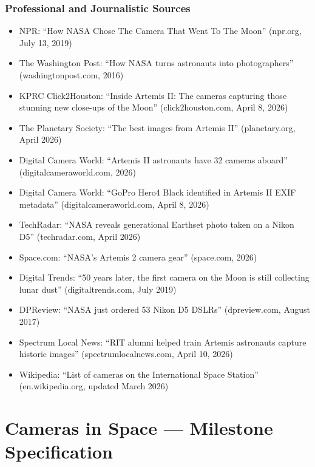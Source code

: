 \documentclass[11pt,letterpaper]{article}
\newcommand{\stageheader}[2]{%
  \noindent\colorbox{#2}{\makebox[\textwidth][l]{%
    \textcolor{white}{\bfseries\sffamily\hspace{6pt}#1\hspace{6pt}}}}%
  \vspace{0.5em}\par%
}
\begin{document}
\subsubsection{Professional and Journalistic Sources}
\begin{itemize}[leftmargin=1.5em]
  \item NPR: ``How NASA Chose The Camera That Went To The Moon'' (npr.org, July 13, 2019)
  \item The Washington Post: ``How NASA turns astronauts into photographers'' (washingtonpost.com, 2016)
  \item KPRC Click2Houston: ``Inside Artemis II: The cameras capturing those stunning new close-ups of the Moon'' (click2houston.com, April 8, 2026)
  \item The Planetary Society: ``The best images from Artemis II'' (planetary.org, April 2026)
  \item Digital Camera World: ``Artemis II astronauts have 32 cameras aboard'' (digitalcameraworld.com, 2026)
  \item Digital Camera World: ``GoPro Hero4 Black identified in Artemis II EXIF metadata'' (digitalcameraworld.com, April 8, 2026)
  \item TechRadar: ``NASA reveals generational Earthset photo taken on a Nikon D5'' (techradar.com, April 2026)
  \item Space.com: ``NASA's Artemis 2 camera gear'' (space.com, 2026)
  \item Digital Trends: ``50 years later, the first camera on the Moon is still collecting lunar dust'' (digitaltrends.com, July 2019)
  \item DPReview: ``NASA just ordered 53 Nikon D5 DSLRs'' (dpreview.com, August 2017)
  \item Spectrum Local News: ``RIT alumni helped train Artemis astronauts capture historic images'' (spectrumlocalnews.com, April 10, 2026)
  \item Wikipedia: ``List of cameras on the International Space Station'' (en.wikipedia.org, updated March 2026)
\end{itemize}

\newpage
\stageheader{STAGE 3 --- MISSION PACKAGE}{tertiary}

\section{Cameras in Space --- Milestone Specification}
\end{document}
